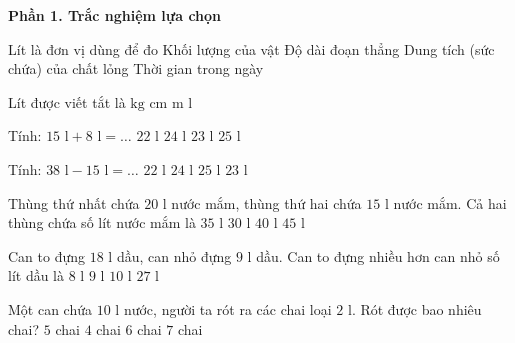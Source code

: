 \textbf{Phần 1. Trắc nghiệm lựa chọn}

\begin{ex} %
Lít là đơn vị dùng để đo
\choice
{Khối lượng của vật}
{Độ dài đoạn thẳng}
{\True Dung tích (sức chứa) của chất lỏng}
{Thời gian trong ngày}
\end{ex}

\begin{ex} %
Lít được viết tắt là
\choice
{$\text{kg}$}
{$\text{cm}$}
{$\text{m}$}
{\True $\text{l}$}
\end{ex}

\begin{ex} %
Tính: $15\text{ l} + 8\text{ l} = \dots$
\choice
{$22\text{ l}$}
{$24\text{ l}$}
{\True $23\text{ l}$}
{$25\text{ l}$}
\end{ex}

\begin{ex} %
Tính: $38\text{ l} - 15\text{ l} = \dots$
\choice
{$22\text{ l}$}
{$24\text{ l}$}
{$25\text{ l}$}
{\True $23\text{ l}$}
\end{ex}

\begin{ex} %
Thùng thứ nhất chứa $20\text{ l}$ nước mắm, thùng thứ hai chứa $15\text{ l}$ nước mắm. Cả hai thùng chứa số lít nước mắm là
\choice
{\True $35\text{ l}$}
{$30\text{ l}$}
{$40\text{ l}$}
{$45\text{ l}$}
\end{ex}

\begin{ex} %
Can to đựng $18\text{ l}$ dầu, can nhỏ đựng $9\text{ l}$ dầu. Can to đựng nhiều hơn can nhỏ số lít dầu là
\choice
{$8\text{ l}$}
{\True $9\text{ l}$}
{$10\text{ l}$}
{$27\text{ l}$}
\end{ex}

\begin{ex} %
Một can chứa $10\text{ l}$ nước, người ta rót ra các chai loại $2\text{ l}$. Rót được bao nhiêu chai?
\choice
{\True $5$ chai}
{$4$ chai}
{$6$ chai}
{$7$ chai}
\end{ex}

